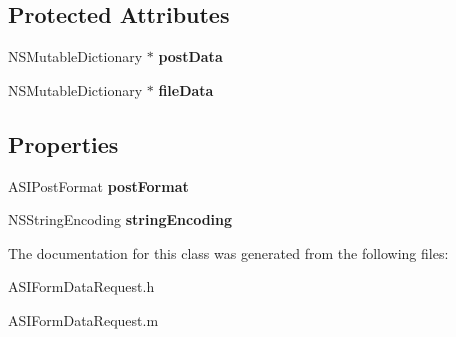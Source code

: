 \subsection*{Protected Attributes}
\begin{DoxyCompactItemize}
\item 
\hypertarget{interface_a_s_i_form_data_request_a79f4daafa8563e0bfe7a20ea868f4c30}{
NSMutableDictionary $\ast$ {\bfseries postData}}
\label{interface_a_s_i_form_data_request_a79f4daafa8563e0bfe7a20ea868f4c30}

\item 
\hypertarget{interface_a_s_i_form_data_request_acdb6fbbceb1c18a5767f4946aca12230}{
NSMutableDictionary $\ast$ {\bfseries fileData}}
\label{interface_a_s_i_form_data_request_acdb6fbbceb1c18a5767f4946aca12230}

\end{DoxyCompactItemize}
\subsection*{Properties}
\begin{DoxyCompactItemize}
\item 
\hypertarget{interface_a_s_i_form_data_request_a0ad5abeee9bb810f180a960c1ac10ae2}{
ASIPostFormat {\bfseries postFormat}}
\label{interface_a_s_i_form_data_request_a0ad5abeee9bb810f180a960c1ac10ae2}

\item 
\hypertarget{interface_a_s_i_form_data_request_a67255c2a30ba48a62383a41648eb5bd2}{
NSStringEncoding {\bfseries stringEncoding}}
\label{interface_a_s_i_form_data_request_a67255c2a30ba48a62383a41648eb5bd2}

\end{DoxyCompactItemize}


The documentation for this class was generated from the following files:\begin{DoxyCompactItemize}
\item 
ASIFormDataRequest.h\item 
ASIFormDataRequest.m\end{DoxyCompactItemize}
